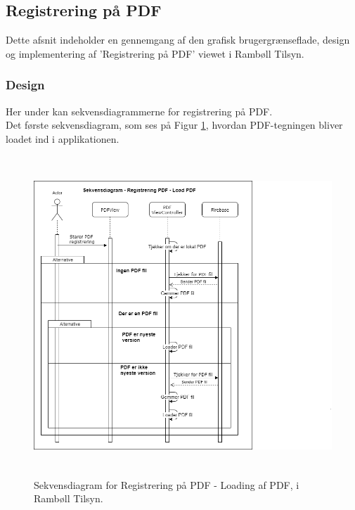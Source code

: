 \subsection{Registrering på PDF}\label{sec:PDF}
Dette afsnit indeholder en gennemgang af den grafisk brugergrænseflade, design og implementering af 'Registrering på PDF' viewet i Rambøll Tilsyn.

\subsubsection{Design}
Her under kan sekvensdiagrammerne for registrering på PDF. \\
Det første sekvensdiagram, som ses på Figur \ref{fig:LoadPDFSekvensDiagram}, hvordan PDF-tegningen bliver loadet ind i applikationen.
\begin{figure}[H] %
	\centering
	\includegraphics[height=12cm, width=15cm]{../ArkitekturDesign/Design/RegisterPDF/LoadPDFSekvensDiagram}
	\caption{Sekvensdiagram for Registrering på PDF - Loading af PDF, i Rambøll Tilsyn.}
	\label{fig:LoadPDFSekvensDiagram}
\end{figure}

\clearpage

